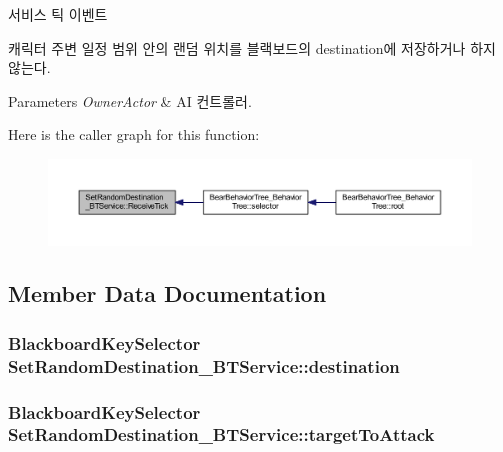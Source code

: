 서비스 틱 이벤트 

캐릭터 주변 일정 범위 안의 랜덤 위치를 블랙보드의 destination에 저장하거나 하지 않는다. 
\begin{DoxyParams}{Parameters}
{\em Owner\+Actor} & AI 컨트롤러. \\
\hline
\end{DoxyParams}


Here is the caller graph for this function\+:
\nopagebreak
\begin{figure}[H]
\begin{center}
\leavevmode
\includegraphics[width=350pt]{class_set_random_destination___b_t_service_a5aaffbeccd6db37b168d93ec1f056464_icgraph}
\end{center}
\end{figure}




\subsection{Member Data Documentation}
\subsubsection[{\texorpdfstring{destination}{destination}}]{\setlength{\rightskip}{0pt plus 5cm}Blackboard\+Key\+Selector Set\+Random\+Destination\+\_\+\+B\+T\+Service\+::destination}\hypertarget{class_set_random_destination___b_t_service_ab259c7024b387a7320ea85e5df8d7016}{}\label{class_set_random_destination___b_t_service_ab259c7024b387a7320ea85e5df8d7016}
\subsubsection[{\texorpdfstring{target\+To\+Attack}{targetToAttack}}]{\setlength{\rightskip}{0pt plus 5cm}Blackboard\+Key\+Selector Set\+Random\+Destination\+\_\+\+B\+T\+Service\+::target\+To\+Attack}\hypertarget{class_set_random_destination___b_t_service_a6c67414130286ac84e546e73af226b2c}{}\label{class_set_random_destination___b_t_service_a6c67414130286ac84e546e73af226b2c}
